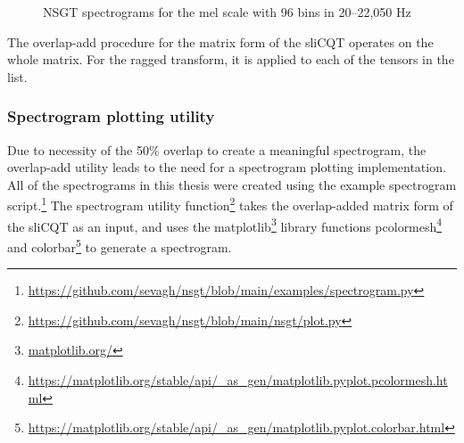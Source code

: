 \documentclass[report.tex]{subfiles}
\begin{document}
\begin{figure}[ht]
	\centering
	\hspace{0.1em}
	\caption{NSGT spectrograms for the mel scale with 96 bins in 20--22,050 Hz}
	\label{fig:overlappedspectrograms}
\end{figure}

The overlap-add procedure for the matrix form of the sliCQT operates on the whole matrix. For the ragged transform, it is applied to each of the tensors in the list.

\subsubsection{Spectrogram plotting utility}
\label{sec:slicqspec}

Due to necessity of the 50\% overlap to create a meaningful spectrogram, the overlap-add utility leads to the need for a spectrogram plotting implementation. All of the spectrograms in this thesis were created using the example spectrogram script.\footnote{\url{https://github.com/sevagh/nsgt/blob/main/examples/spectrogram.py}} The spectrogram utility function\footnote{\url{https://github.com/sevagh/nsgt/blob/main/nsgt/plot.py}} takes the overlap-added matrix form of the sliCQT as an input, and uses the matplotlib\footnote{\url{matplotlib.org/}} library functions pcolormesh\footnote{\url{https://matplotlib.org/stable/api/_as_gen/matplotlib.pyplot.pcolormesh.html}} and colorbar\footnote{\url{https://matplotlib.org/stable/api/_as_gen/matplotlib.pyplot.colorbar.html}} to generate a spectrogram.
\end{document}
